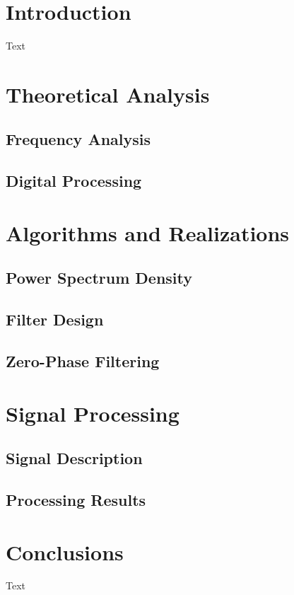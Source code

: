 \section{Introduction}

Text
\section{Theoretical Analysis}

\subsection{Frequency Analysis}

\subsection{Digital Processing}


\section{Algorithms and Realizations}

\subsection{Power Spectrum Density}

\subsection{Filter Design}

\subsection{Zero-Phase Filtering}


\section{Signal Processing}

\subsection{Signal Description}

\subsection{Processing Results}

\section{Conclusions}

Text



